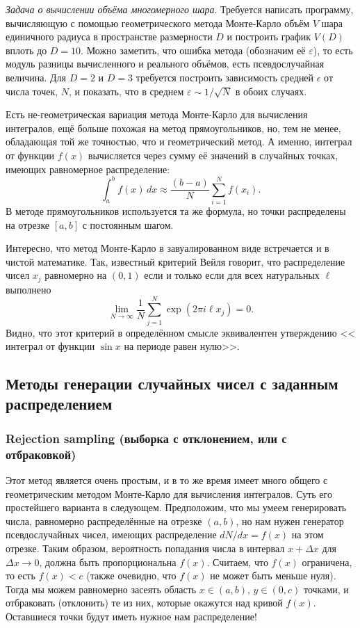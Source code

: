 \documentclass{book}
\begin{document}
\textit{Задача о вычислении объёма многомерного шара}. Требуется написать программу, вычисляющую с
помощью геометрического метода Монте-Карло объём $V$ шара единичного радиуса в пространстве
размерности $D$ и построить график $V(D)$ вплоть до $D = 10$. Можно заметить, что ошибка метода
(обозначим её $\varepsilon$), то есть модуль разницы вычисленного и реального объёмов, есть
псевдослучайная величина. Для $D = 2$ и $D = 3$ требуется построить зависимость средней $\epsilon$
от числа точек, $N$, и показать, что в среднем $\varepsilon \sim 1 / \sqrt{N}$ в обоих случаях.

Есть не-геометрическая вариация метода Монте-Карло для вычисления интегралов, ещё больше похожая на
метод прямоугольников, но, тем не менее, обладающая той же точностью, что и геометрический метод. А
именно, интеграл от функции $f(x)$ вычисляется через сумму её значений в случайных точках, имеющих
равномерное распределение:
\begin{equation}
    \int_a^b f(x) \, dx \approx \frac{(b - a)}{N} \sum_{i=1}^N f(x_i).
\end{equation}
В методе прямоугольников используется та же формула, но точки распределены на отрезке $[a, b]$ с
постоянным шагом.

Интересно, что метод Монте-Карло в завуалированном виде встречается и в чистой математике. Так,
известный критерий Вейля говорит, что распределение чисел $x_j$ равномерно на $(0, 1)$ если и
только если для всех натуральных $\ell$ выполнено
\begin{equation}
    \lim_{N \to \infty} \frac{1}{N} \sum_{j = 1}^N \exp(2 \pi i \ell x_j) = 0.
\end{equation}
Видно, что этот критерий в определённом смысле эквивалентен утверждению << интеграл от функции
$\sin x$ на периоде равен нулю>>.

\subsection{Методы генерации случайных чисел с заданным распределением}

\subsubsection{Rejection sampling (выборка с отклонением, или с отбраковкой)}

Этот метод является очень простым, и в то же время имеет много общего с геометрическим методом
Монте-Карло для вычисления интегралов. Суть его простейшего варианта в следующем. Предположим, что
мы умеем генерировать числа, равномерно распределённые на отрезке $(a, b)$, но нам нужен генератор
псевдослучайных чисел, имеющих распределение $dN/dx = f(x)$ на этом отрезке. Таким образом,
вероятность попадания числа в интервал $x + \Delta x$ для $\Delta x \to 0$, должна быть пропорциональна $f(x)$.
Считаем, что $f(x)$ ограничена, то есть $f(x) < c$ (также очевидно, что $f(x)$ не может быть меньше
нуля). Тогда мы можем равномерно засеять область $x \in (a, b)$, $y \in (0, c)$ точками, и
отбраковать (отклонить) те из них, которые окажутся над кривой $f(x)$. Оставшиеся точки будут иметь
нужное нам распределение!
\end{document}
